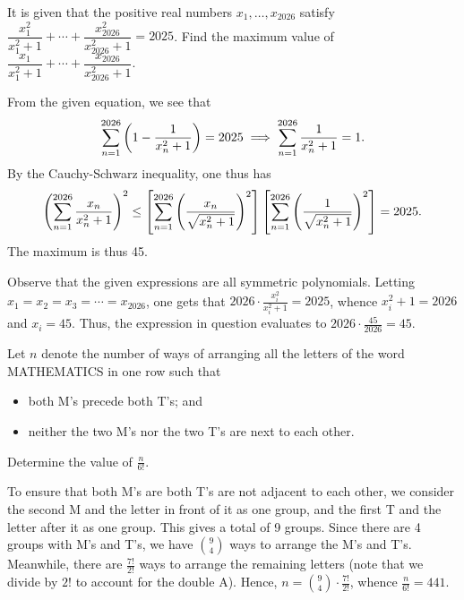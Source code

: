 \clearpage
\begin{question}[45]\label{Q::2024-O-1-23}
    It is given that the positive real numbers $x_1, \ldots, x_{2026}$ satisfy $\dfrac{x_1^2}{x_1^2 + 1} + \cdots + \dfrac{x_{2026}^2}{x_{2026}^2 + 1} = 2025$. Find the maximum value of $\dfrac{x_1}{x_1^2 + 1} + \cdots + \dfrac{x_{2026}}{x_{2026}^2 + 1}$.
\end{question}
\begin{solution}
    From the given equation, we see that \[\sum_{n=1}^{2026} \left( 1 - \frac1{x_n^2 +1} \right) = 2025 \implies \sum_{n=1}^{2026} \frac1{x_n^2 + 1} = 1.\] By the Cauchy-Schwarz inequality, one thus has \[\left( \sum_{n=1}^{2026} \frac{x_n}{x_n^2 + 1} \right)^2 \leq \left[ \sum_{n=1}^{2026} \left( \frac{x_n}{\sqrt{x_n^2 + 1}} \right)^2 \right] \left[ \sum_{n=1}^{2026} \left( \frac{1}{\sqrt{x_n^2 + 1}} \right)^2 \right] = 2025.\] The maximum is thus 45.
\end{solution}
\begin{solution}
    Observe that the given expressions are all symmetric polynomials. Letting $x_1 = x_2 = x_3 = \cdots = x_{2026}$, one gets that $2026 \cdot \frac{x_i^2}{x_i^2 + 1} = 2025$, whence $x_i^2 + 1 = 2026$ and $x_i = 45$. Thus, the expression in question evaluates to $2026 \cdot \frac{45}{2026} = 45$. 
\end{solution}

\begin{question}[441]\label{Q::2024-O-1-24}
    Let $n$ denote the number of ways of arranging all the letters of the word MATHEMATICS in one row such that
    \begin{itemize}
        \item both M's precede both T's; and
        \item neither the two M's nor the two T's are next to each other.
    \end{itemize}
    Determine the value of $\frac{n}{6!}$.
\end{question}
\begin{solution*}
    To ensure that both M's are both T's are not adjacent to each other, we consider the second M and the letter in front of it as one group, and the first T and the letter after it as one group. This gives a total of 9 groups. Since there are 4 groups with M's and T's, we have $\binom{9}{4}$ ways to arrange the M's and T's. Meanwhile, there are $\frac{7!}{2!}$ ways to arrange the remaining letters (note that we divide by $2!$ to account for the double A). Hence, $n = \binom{9}{4} \cdot \frac{7!}{2!}$, whence $\frac{n}{6!} = 441$.
\end{solution*}

